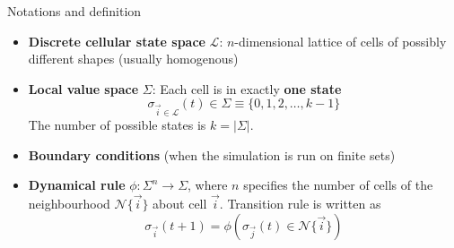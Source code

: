 \begin{frame}{Notations and definition}
	  \begin{itemize}
	  \item \textbf{Discrete cellular state space} $\mathcal{L}$: $n$-dimensional lattice of cells of possibly different shapes (usually homogenous)
	  \item \textbf{Local value space} $\Sigma$: Each cell is in exactly \textbf{one state} $$\sigma_{\vec{i}\in \mathcal{L}}(t) \in \Sigma\equiv \{0,1,2,\dots,k-1 \}$$ The number of possible states is  $k =|\Sigma|$.
   \item \textbf{Boundary conditions} (when the simulation is run on finite sets)
	  \item \textbf{Dynamical rule} $\phi: \Sigma^n \to \Sigma$, where $n$ specifies the number of cells of the neighbourhood $\mathcal{N}\{\vec{i}\}$ about cell $\vec{i}$. Transition rule is written as
        $$\sigma_{\vec{i}}(t+1) = \phi(\sigma_{\vec{j}}(t)\in \mathcal{N}\{\vec{i}\})$$
	  \end{itemize}



\end{frame}



